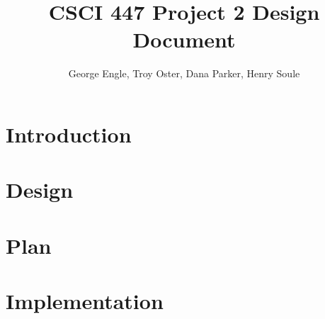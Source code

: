 \documentclass{article}
\title{CSCI 447 Project 2 Design Document}
\author{George Engle, Troy Oster, Dana Parker, Henry Soule}
\begin{document}
\maketitle
\section{Introduction}
\section{Design}
\section{Plan}
\section{Implementation}
\end{document}

